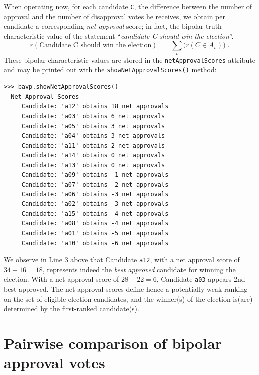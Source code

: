 When operating now, for each candidate \texttt{C}, the difference between the number of approval and the number of disapproval votes he receives, we obtain per candidate a corresponding \emph{net approval} score; in fact, the bipolar truth characteristic value of the statement ``\emph{candidate C should win the election}''.
\begin{equation}
r(\text{Candidate C should win the election}) \;=\; \sum_v \big(r(C \in A_v)\big)\;.
\end{equation}
These bipolar characteristic values are stored in the \texttt{netApprovalScores} attribute and may be printed out with the \texttt{showNetApprovalScores()} method:
\begin{lstlisting}
>>> bavp.showNetApprovalScores()
  Net Approval Scores
     Candidate: 'a12' obtains 18 net approvals
     Candidate: 'a03' obtains 6 net approvals
     Candidate: 'a05' obtains 3 net approvals
     Candidate: 'a04' obtains 3 net approvals
     Candidate: 'a11' obtains 2 net approvals
     Candidate: 'a14' obtains 0 net approvals
     Candidate: 'a13' obtains 0 net approvals
     Candidate: 'a09' obtains -1 net approvals
     Candidate: 'a07' obtains -2 net approvals
     Candidate: 'a06' obtains -3 net approvals
     Candidate: 'a02' obtains -3 net approvals
     Candidate: 'a15' obtains -4 net approvals
     Candidate: 'a08' obtains -4 net approvals
     Candidate: 'a01' obtains -5 net approvals
     Candidate: 'a10' obtains -6 net approvals
\end{lstlisting}
We observe in Line 3 above that Candidate \texttt{a12}, with a net approval score of $34 - 16 = 18$, represents indeed the \emph{best approved} candidate for winning the election. With a net approval score of $28-22 = 6$, Candidate \texttt{a03} appears 2nd-best approved. The net approval scores define hence a potentially weak ranking on the set of eligible election candidates, and the winner(s) of the election is(are) determined by the first-ranked candidate(s).

\section{Pairwise comparison of bipolar approval votes}
\label{sec:20.3}

